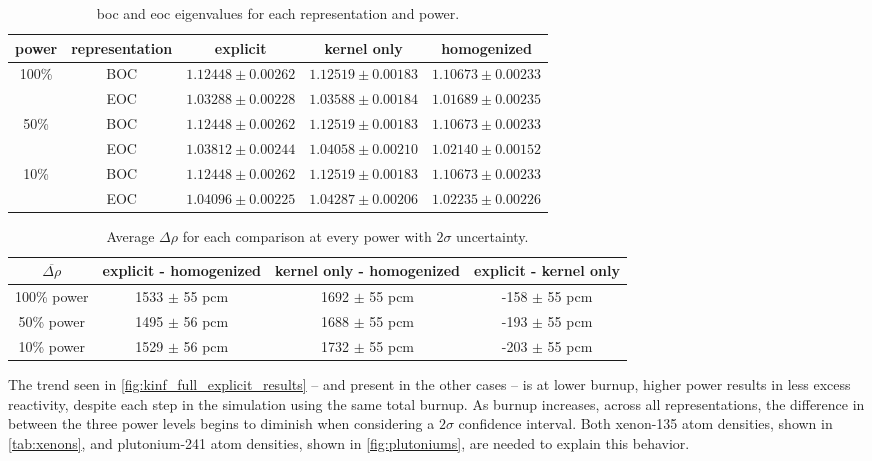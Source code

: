 \documentclass[letterpaper]{physor2024}
\begin{document}
\begin{table}[!h]
    \centering
    \caption{\gls{boc} and \gls{eoc} eigenvalues for each representation and power.}
    \begin{tabular}{|c|c|c|c|c|} \hline
    \multicolumn{1}{|c|}{power} & \multicolumn{1}{c|}{representation} & \multicolumn{1}{c|}{explicit} & \multicolumn{1}{c|}{kernel only} & \multicolumn{1}{c|}{homogenized} \\
    \hline
    \multirow{2}{*}{100\%}
    & BOC & $1.12448 \pm 0.00262$ & $1.12519  \pm 0.00183$ & $1.10673 \pm 0.00233 $ \\
    \cline{2-5}
    & EOC & $1.03288 \pm 0.00228$ & $1.03588 \pm 0.00184$ & $1.01689 \pm 0.00235 $ \\
    \hline
    \multirow{2}{*}{50\%}
    & BOC & $1.12448 \pm 0.00262$ & $1.12519  \pm 0.00183$ & $1.10673 \pm 0.00233$ \\
    \cline{2-5}
    & EOC & $1.03812 \pm 0.00244$ & $1.04058 \pm 0.00210$ & $1.02140 \pm 0.00152$ \\
    \hline
    \multirow{2}{*}{10\%}
    & BOC & $1.12448 \pm 0.00262$ & $1.12519 \pm 0.00183$ & $1.10673 \pm 0.00233$ \\
    \cline{2-5}
    & EOC & $1.04096 \pm 0.00225$ & $1.04287 \pm  0.00206$ & $1.02235 \pm 0.00226$ \\
    \cline{1-5}
    \end{tabular}
    \label{tab:begin_to_end}
    \vspace*{-0.3cm}
\end{table}

\begin{table}[!h]
    \centering
    \caption{Average $\Delta \rho$ for each comparison at every power with $2\sigma$ uncertainty.}
    \begin{tabular}{c|c|c|c}
    $\overline{\Delta \rho}$ & explicit - homogenized & kernel only - homogenized & explicit - kernel only \\ \hline
    100\% power & 1533 $\pm$ 55 pcm & 1692 $\pm$ 55 pcm & -158 $\pm$ 55 pcm \\
    50\% power & 1495 $\pm$ 56 pcm & 1688 $\pm$ 55 pcm & -193 $\pm$ 55 pcm\\
    10\% power & 1529 $\pm$ 56 pcm & 1732 $\pm$ 55 pcm & -203 $\pm$ 55 pcm
    \end{tabular}
    \label{tab:average_pcms}
\end{table}

The trend seen in \cref{fig:kinf_full_explicit_results} -- and present in the other cases -- is at lower burnup, higher power results in less excess reactivity, despite each step in the simulation using the same total burnup. As burnup increases, across all representations, the difference in \kinf between the three power levels begins to diminish when considering a $2\sigma$ confidence interval. Both xenon-135 atom densities, shown in \cref{tab:xenons}, and plutonium-241 atom densities, shown in \cref{fig:plutoniums}, are needed to explain this behavior.
\end{document}
